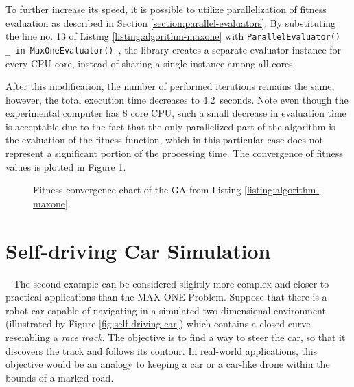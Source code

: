 To further increase its speed, it is possible to utilize parallelization of fitness evaluation as described in Section \ref{section:parallel-evaluators}. By substituting the line no. 13 of Listing \ref{listing:algorithm-maxone} with \texttt{ParallelEvaluator() { _ in MaxOneEvaluator() }}, the library creates a separate evaluator instance for every CPU core, instead of sharing a single instance among all cores.

After this modification, the number of performed iterations remains the same, however, the total execution time decreases to 4.2~seconds. Note even though the experimental computer has 8 core CPU, such a small decrease in evaluation time is acceptable due to the fact that the only parallelized part of the algorithm is the evaluation of the fitness function, which in this particular case does not represent a significant portion of the processing time. The convergence of fitness values is plotted in Figure \ref{fig:maxone-fitness}.

\begin{figure}[ht]
	\centering
	\caption[MAX-ONE genetic algorithm fitness convergence chart.]{Fitness convergence chart of the GA from Listing \ref{listing:algorithm-maxone}.}
	\label{fig:maxone-fitness}
\end{figure}

\section{Self-driving Car Simulation}~\label{section:self-driving-car}
The second example can be considered slightly more complex and closer to practical applications than the MAX-ONE Problem. Suppose that there is a robot car capable of navigating in a simulated two-dimensional environment (illustrated by Figure \ref{fig:self-driving-car}) which contains a closed curve resembling a \textit{race track}. The objective is to find a way to steer the car, so that it discovers the track and follows its contour. In real-world applications, this objective would be an analogy to keeping a car or a car-like drone within the bounds of a marked road.

